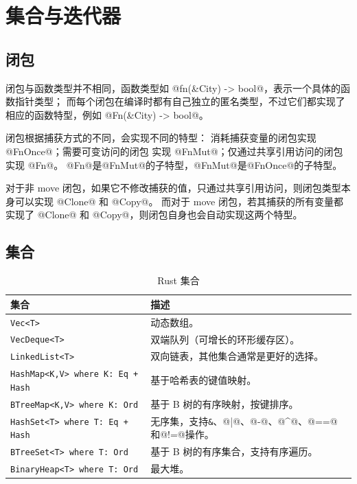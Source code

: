 \section{集合与迭代器}
\subsection{闭包}
闭包与函数类型并不相同，函数类型如 @fn(&City) -> bool@，表示一个具体的函数指针类型；
而每个闭包在编译时都有自己独立的匿名类型，不过它们都实现了相应的函数特型，例如 @Fn(&City) -> bool@。

闭包根据捕获方式的不同，会实现不同的特型：
消耗捕获变量的闭包实现 @FnOnce@；需要可变访问的闭包 实现 @FnMut@；仅通过共享引用访问的闭包实现 @Fn@。
@Fn@是@FnMut@的子特型，@FnMut@是@FnOnce@的子特型。

对于非 move 闭包，如果它不修改捕获的值，只通过共享引用访问，则闭包类型本身可以实现 @Clone@ 和 @Copy@。
而对于 move 闭包，若其捕获的所有变量都实现了 @Clone@ 和 @Copy@，则闭包自身也会自动实现这两个特型。

\subsection{集合}
\begin{table}[ht]
	\centering
	\begin{tabular}{|l|p{20em}|}
		\hline
		\textbf{集合}                            & \textbf{描述}                             \\
		\hline
		\verb|Vec<T>|                          & 动态数组。                                   \\
		\hline
		\verb|VecDeque<T>|                     & 双端队列（可增长的环形缓存区）。                        \\
		\hline
		\verb|LinkedList<T>|                   & 双向链表，其他集合通常是更好的选择。                      \\
		\hline
		\verb|HashMap<K,V> where K: Eq + Hash| & 基于哈希表的键值映射。                             \\
		\hline
		\verb|BTreeMap<K,V> where K: Ord|      & 基于 B 树的有序映射，按键排序。                       \\
		\hline
		\verb|HashSet<T> where T: Eq + Hash|   & 无序集，支持\verb|&|、@|@、@-@、@^@、@==@和@!=@操作。 \\
		\hline
		\verb|BTreeSet<T> where T: Ord|        & 基于 B 树的有序集合，支持有序遍历。                     \\
		\hline
		\verb|BinaryHeap<T> where T: Ord|      & 最大堆。                                    \\
		\hline
	\end{tabular}
	\caption{Rust 集合}
\end{table}


